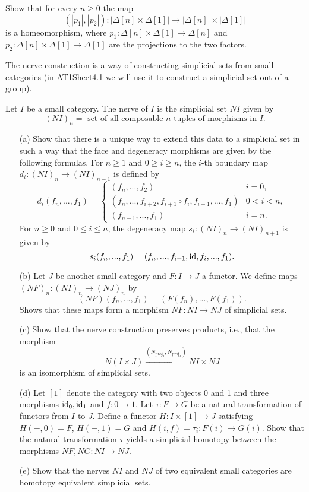 \label{exercise:AT1Sheet3.2}
Show that for every $n\ge0$ the map
\[
(|p_1|,|p_2|) : |\Delta[n] \times \Delta[1]| \to |\Delta[n]|\times|\Delta[1]|
\]
is a homeomorphism, where $p_1 : \Delta[n] \times\Delta[1]\to\Delta[n]$ and $p_2 : \Delta[n] \times\Delta[1] \to\Delta[1]$ are the
projections to the two factors.

\begin{sketch}
\end{sketch}

The nerve construction is a way of constructing simplicial sets from small categories (in \hyperref[exercise:AT1Sheet4.1]{AT1Sheet4.1} we will use it to construct a simplicial set out of a group).

\label{exercise:AT1Sheet3.3}
Let $I$ be a small category. The nerve of $I$ is the simplicial set $NI$ given by
\[
(NI)_n = \text{ set of all composable $n$-tuples of morphisms in } I.
\]
\begin{enumerate}
    \item[(a)] Show that there is a unique way to extend this data to a simplicial set in such a way that the face and degeneracy morphisms are given by the following formulas. For $n\ge1$ and $0\ge i\ge n$, the $i$-th boundary map $d_i : (NI)_n \to (NI)_{n-1}$ is defined by
    \[d_i(f_n,...,f_1) = \begin{cases}
        (f_n,...,f_2) & i = 0,\\
        (f_n,...,f_{i+2},f_{i+1}\circ f_i,f_{i-1},...,f_1) &0 < i < n,\\
        (f_{n-1},...,f_1) &i = n.\end{cases}\]
    For $n\ge0$ and $0\le i\le n$, the degeneracy map $s_i : (NI)_n\to (NI)_{n+1}$ is given by
    \[s_i(f_n,...,f_1) = (f_n,...,f_{i+1},\operatorname{id},f_i,...,f_1).\]
    \item[(b)] Let $J$ be another small category and $F : I\to J$ a functor. We define maps $(NF)_n : (NI)_n\to (NJ)_n$ by
    \[(NF)(f_n,...,f_1) = (F(f_n),...,F(f_1)).\]
    Shows that these maps form a morphism $NF : NI\to NJ$ of simplicial sets.
    
    \item[(c)] Show that the nerve construction preserves products, i.e., that the morphism
    \[
    N(I \times J) \xrightarrow{(N_{\operatorname{proj}_I} , N_{\operatorname{proj}_J} )}NI \times NJ
    \]
    is an isomorphism of simplicial sets.
    
    \item[(d)] Let $[1]$ denote the category with two objects 0 and 1 and three morphisms $\operatorname{id}_0, \operatorname{id}_1$ and $f : 0\to 1$. Let $\tau : F\to G$ be a natural transformation of functors from $I$ to $J$. Define a functor $H : I\times[1]\to J$ satisfying $H(-,0) = F$, $H(-,1) = G$ and $H(i,f) = \tau_i : F(i)\to G(i)$. Show that the natural transformation $\tau$ yields a simplicial homotopy between the morphisms $NF, NG : NI\to NJ$.

    \item[(e)] Show that the nerves $NI$ and $NJ$ of two equivalent small categories are homotopy equivalent simplicial sets.
\end{enumerate}

